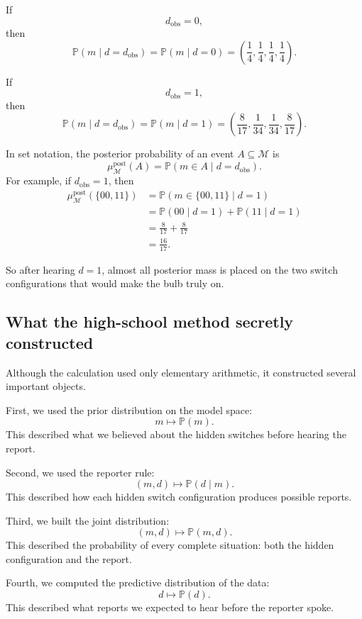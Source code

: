 \documentclass[11pt]{article}
\newcommand{\M}{\mathcal{M}}
\newcommand{\dobs}{d_{\mathrm{obs}}}
\begin{document}
If
\[
    \dobs=0,
\]
then
\[
    \mathbb{P}(m\mid d=\dobs)
    =
    \mathbb{P}(m\mid d=0)
    =
    \left(
        \frac{1}{4},
        \frac{1}{4},
        \frac{1}{4},
        \frac{1}{4}
    \right).
\]

If
\[
    \dobs=1,
\]
then
\[
    \mathbb{P}(m\mid d=\dobs)
    =
    \mathbb{P}(m\mid d=1)
    =
    \left(
        \frac{8}{17},
        \frac{1}{34},
        \frac{1}{34},
        \frac{8}{17}
    \right).
\]

In set notation, the posterior probability of an event \(A\subseteq\M\) is
\[
    \mu^{\mathrm{post}}_{\M}(A)
    =
    \mathbb{P}(m\in A\mid d=\dobs).
\]
For example, if \(\dobs=1\), then
\[
\begin{aligned}
    \mu^{\mathrm{post}}_{\M}(\{00,11\})
    &=
    \mathbb{P}(m\in\{00,11\}\mid d=1)
    \\
    &=
    \mathbb{P}(00\mid d=1)
    +
    \mathbb{P}(11\mid d=1)
    \\
    &=
    \frac{8}{17}
    +
    \frac{8}{17}
    \\
    &=
    \frac{16}{17}.
\end{aligned}
\]

So after hearing \(d=1\), almost all posterior mass is placed on the two switch configurations that would make the bulb truly on.

\subsection{What the high-school method secretly constructed}

Although the calculation used only elementary arithmetic, it constructed several important objects.

First, we used the prior distribution on the model space:
\[
    m \longmapsto \mathbb{P}(m).
\]
This described what we believed about the hidden switches before hearing the report.

Second, we used the reporter rule:
\[
    (m,d) \longmapsto \mathbb{P}(d\mid m).
\]
This described how each hidden switch configuration produces possible reports.

Third, we built the joint distribution:
\[
    (m,d) \longmapsto \mathbb{P}(m,d).
\]
This described the probability of every complete situation: both the hidden configuration and the report.

Fourth, we computed the predictive distribution of the data:
\[
    d \longmapsto \mathbb{P}(d).
\]
This described what reports we expected to hear before the reporter spoke.
\end{document}
